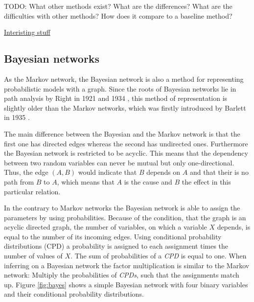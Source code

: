 TODO: What other methods exist? What are the differences? What are the difficulties with other methods? How does it compare to a baseline method?

\href{https://www.math.leidenuniv.nl/scripties/BSC-Obbens.pdf}{Interisting stuff} \cite{obbens2014inference}

\subsection{Bayesian networks} \label{sec:bayes}

As the Markov network, the Bayesian network is also a method for representing probabilistic models with a graph. Since the roots of Bayesian networks lie in path analysis by Right in 1921 \cite{wright1921correlation} and 1934 \cite{wright1934method}, this method of representation is slightly older than the Markov networks, which was firstly introduced by Barlett in 1935 \cite{bartlett1935contingency}.

The main difference between the Bayesian and the Markov network is that the first one has directed edges whereas the second has undirected ones. Furthermore the Bayesian network is restricted to be acyclic. This means that the dependency between two random variables can never be mutual but only one-directional. Thus, the edge $(A, B)$ would indicate that $B$ depends on $A$ and that their is no path from $B$ to $A$, which means that $A$ is the cause and $B$ the effect in this particular relation.

In the contrary to Markov networks the Bayesian network is able to assign the parameters by using probabilities. Because of the condition, that the graph is an acyclic directed graph, the number of variables, on which a variable $X$ depends, is equal to the number of its incoming edges. Using conditional probability distributions (CPD) a probability is assigned to each assignment times the number of values of $X$. The sum of probabilities of a \textit{CPD} is equal to one. When inferring on a Bayesian network the factor multiplication is similar to the Markov network: Multiply the probabilities of \textit{CPDs}, such that the assignments match up. Figure \ref{fig:bayes} shows a simple Bayesian network with four binary variables and their conditional probability distributions. 

